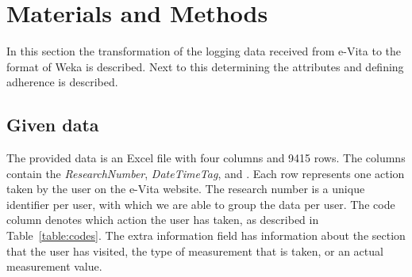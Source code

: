 \section{Materials and Methods} \label{section:materialsAndMethods}
In this section the transformation of the logging data received from e-Vita to the  format of Weka is described. Next to this determining the attributes and defining adherence is described.
\subsection{Given data} \label{subsection:givenData}
The provided data is an Excel file with four columns and 9415 rows. The columns contain the \emph{ResearchNumber}, \emph{DateTimeTag},  and . Each row represents one action taken by the user on the e-Vita website. The research number is a unique identifier per user, with which we are able to group the data per user. The code column denotes which action the user has taken, as described in Table~\ref{table:codes}. The extra information field has information about the section that the user has visited, the type of measurement that is taken, or an actual measurement value.

